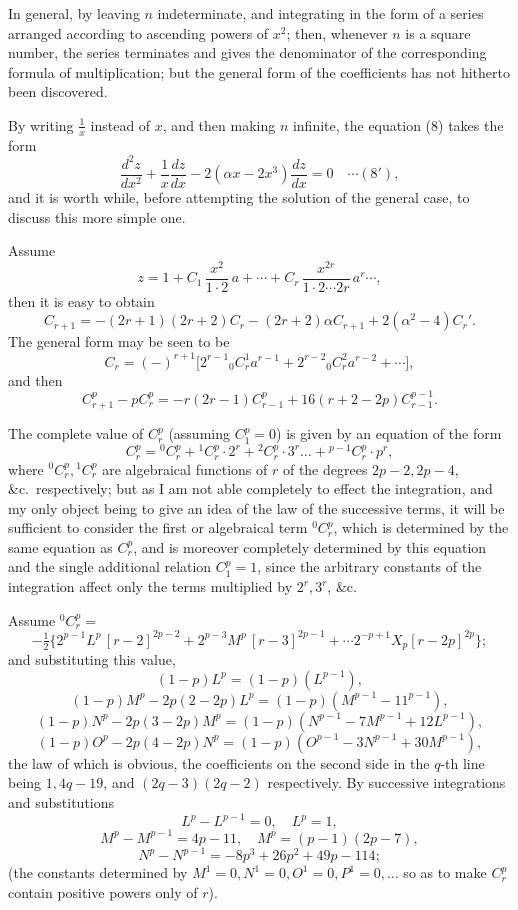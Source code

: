 \documentclass[12pt,a4paper]{article}
\begin{document}
In general, by leaving $n$ indeterminate, and integrating in the form of a series arranged according to ascending powers of $x^2$; then, whenever $n$ is a square number, the series terminates and gives the denominator of the corresponding formula of multiplication; but the general form of the coefficients has not hitherto been discovered.

By writing $\frac{1}{x}$ instead of $x$, and then making $n$ infinite, the equation (8) takes the form
\[
\frac{d^2z}{dx^2} + \frac{1}{x}\frac{dz}{dx} - 2(\alpha x - 2x^3)\frac{dz}{dx} = 0 \quad\cdots(8'),
\]
and it is worth while, before attempting the solution of the general case, to discuss this more simple one\footnotemark.

Assume
\[
z = 1 + C_1\,\frac{x^2}{1\cdot 2}\,a + \cdots + C_r\,\frac{x^{2r}}{1\cdot 2 \cdots 2r}\,a^r \cdots,
\]
then it is easy to obtain
\[
C_{r+1} = -(2r+1)(2r+2)C_r - (2r+2)\alpha C_{r+1} + 2(\alpha^2 - 4)C_r'.
\]
The general form may be seen to be
\[
C_r = (-)^{r+1}\bigl[2^{r-1} {}_0 C_r^1 a^{r-1} + 2^{r-2} {}_0 C_r^2 a^{r-2} + \cdots\bigr],
\]
and then
\[
C_{r+1}^p - p C_r^p = -r(2r-1)C_{r-1}^p + 16(r + 2 - 2p) C_{r-1}^{p-1}.
\]

The complete value of $C_r^p$ (assuming $C_1^p = 0$) is given by an equation of the form
\[
C_r^p = {}^0 C_r^p + {}^1 C_r^p \cdot 2^r + {}^2 C_r^p \cdot 3^r \ldots + {}^{p-1} C_r^p \cdot p^r,
\]
where ${}^0C_r^p, {}^1 C_r^p$ are algebraical functions of $r$ of the degrees $2p-2, 2p-4$, \&c.\ respectively; but as I am not able completely to effect the integration, and my only object being to give an idea of the law of the successive terms, it will be sufficient to consider the first or algebraical term ${}^0C_r^p$, which is determined by the same equation as $C_r^p$, and is moreover completely determined by this equation and the single additional relation $C_1^p = 1$, since the arbitrary constants of the integration affect only the terms multiplied by $2^r, 3^r$, \&c.

Assume ${}^0C_r^p =$
\[
-\tfrac12\bigl\{2^{p-1}L^p\,[r-2]^{2p-2} + 2^{p-3}M^p\,[r-3]^{2p-1} + \cdots 2^{-p+1}X_p [r - 2p]^{2p}\bigr\};
\]
and substituting this value,
\[
(1-p)L^p = (1-p)(L^{p-1}),
\]
\[
(1-p)M^p - 2p(2-2p)L^p = (1-p)(M^{p-1} - 11^{p-1}),
\]
\[
(1-p)N^p - 2p(3-2p)M^p = (1-p)(N^{p-1} - 7M^{p-1} + 12L^{p-1}),
\]
\[
(1-p)O^p - 2p(4-2p)N^p = (1-p)(O^{p-1} - 3N^{p-1} + 30M^{p-1}),
\]
the law of which is obvious, the coefficients on the second side in the $q$-th line being $1, 4q - 19$, and $(2q - 3)(2q - 2)$ respectively. By successive integrations and substitutions
\[
L^p - L^{p-1} = 0,\quad L^p = 1,
\]
\[
M^p - M^{p-1} = 4p - 11,\quad M^p = (p - 1)(2p - 7),
\]
\[
N^p - N^{p-1} = -8p^3 + 26p^2 + 49p - 114;
\]
(the constants determined by $M^1 = 0, N^1 = 0, O^1 = 0, P^1 = 0,\ldots$ so as to make $C_r^p$ contain positive powers only of $r$).
\end{document}
